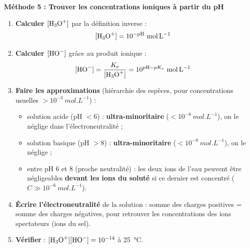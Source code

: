 \documentclass[11pt]{article}
\begin{document}
\textbf{Méthode 5 : Trouver les concentrations ioniques à partir du pH}\par
\begin{methode}
\begin{enumerate}
\item \textbf{Calculer $[\ce{H3O+}]$} par la définition inverse :
\[ [\ce{H3O+}] = 10^{-\text{pH}}\ \si{mol.L^{-1}} \]
\item \textbf{Calculer $[\ce{HO-}]$} grâce au produit ionique :
\[ [\ce{HO-}] = \frac{K_e}{[\ce{H3O+}]} = 10^{\text{pH} - pK_e}\ \si{mol.L^{-1}} \]
\item \textbf{Faire les approximations} (hiérarchie des espèces, pour concentrations usuelles $> 10^{-3}\ \si{mol.L^{-1}}$) :
\begin{itemize}
\item solution acide (pH $< 6$) :  \textbf{ultra-minoritaire} ($< 10^{-8}\ \si{mol.L^{-1}}$), on le néglige dans l'électroneutralité ;
\item solution basique (pH $> 8$) :  \textbf{ultra-minoritaire} ($< 10^{-8}\ \si{mol.L^{-1}}$), on le néglige ;
\item entre pH 6 et 8 (proche neutralité) : les deux ions de l'eau peuvent être négligeables \textbf{devant les ions du soluté} si ce dernier est concentré ($C \gg 10^{-6}\ \si{mol.L^{-1}}$).
\end{itemize}
\item \textbf{Écrire l'électroneutralité} de la solution : somme des charges positives = somme des charges négatives, pour retrouver les concentrations des ions spectateurs (ions du sel).
\item \textbf{Vérifier} : $[\ce{H3O+}][\ce{HO-}] = 10^{-14}$ à \SI{25}{\celsius}.
\end{enumerate}
\end{methode}
\end{document}
